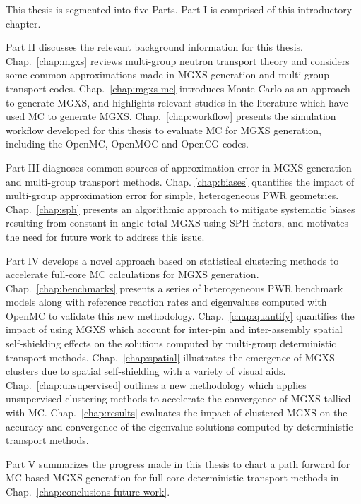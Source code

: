 This thesis is segmented into five Parts. Part I is comprised of this introductory chapter.

Part II discusses the relevant background information for this thesis. Chap.~\ref{chap:mgxs} reviews multi-group neutron transport theory and considers some common approximations made in \ac{MGXS} generation and multi-group transport codes. Chap.~\ref{chap:mgxs-mc} introduces Monte Carlo as an approach to generate \ac{MGXS}, and highlights relevant studies in the literature which have used \ac{MC} to generate \ac{MGXS}. Chap.~\ref{chap:workflow} presents the simulation workflow developed for this thesis to evaluate \ac{MC} for \ac{MGXS} generation, including the OpenMC, OpenMOC and OpenCG codes.

Part III diagnoses common sources of approximation error in \ac{MGXS} generation and multi-group transport methods. Chap. \ref{chap:biases} quantifies the impact of multi-group approximation error for simple, heterogeneous \ac{PWR} geometries. Chap.~\ref{chap:sph} presents an algorithmic approach to mitigate systematic biases resulting from constant-in-angle total \ac{MGXS} using \ac{SPH} factors, and motivates the need for future work to address this issue.

Part IV develops a novel approach based on statistical clustering methods to accelerate full-core \ac{MC} calculations for \ac{MGXS} generation. Chap.~\ref{chap:benchmarks} presents a series of heterogeneous \ac{PWR} benchmark models along with reference reaction rates and eigenvalues computed with OpenMC to validate this new methodology. Chap.~\ref{chap:quantify} quantifies the impact of using \ac{MGXS} which account for inter-pin and inter-assembly spatial self-shielding effects on the solutions computed by multi-group deterministic transport methods. Chap.~\ref{chap:spatial} illustrates the emergence of \ac{MGXS} clusters due to spatial self-shielding with a variety of visual aids. Chap.~\ref{chap:unsupervised} outlines a new methodology which applies unsupervised clustering methods to accelerate the convergence of \ac{MGXS} tallied with \ac{MC}. Chap.~\ref{chap:results} evaluates the impact of clustered \ac{MGXS} on the accuracy and convergence of the eigenvalue solutions computed by deterministic transport methods.

Part V summarizes the progress made in this thesis to chart a path forward for \ac{MC}-based \ac{MGXS} generation for full-core deterministic transport methods in Chap.~\ref{chap:conclusions-future-work}.


